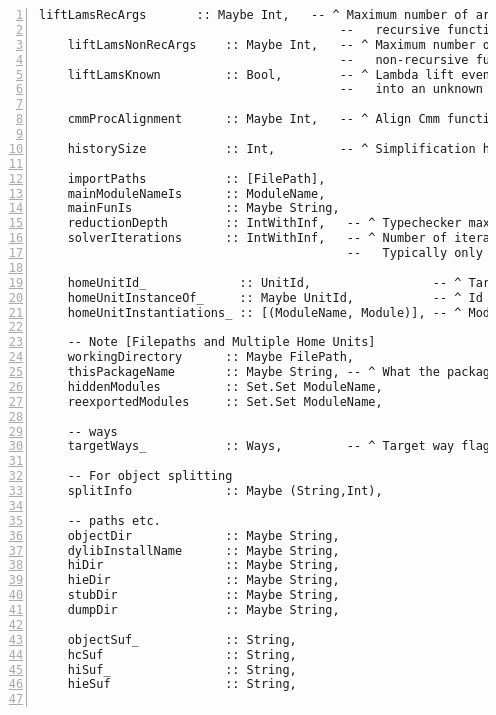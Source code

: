 \documentclass[en]{pracamgr}
\begin{document}
\begin{lstlisting}[numbers=left,stepnumber=1]
    liftLamsRecArgs       :: Maybe Int,   -- ^ Maximum number of arguments after lambda lifting a
                                          --   recursive function.
    liftLamsNonRecArgs    :: Maybe Int,   -- ^ Maximum number of arguments after lambda lifting a
                                          --   non-recursive function.
    liftLamsKnown         :: Bool,        -- ^ Lambda lift even when this turns a known call
                                          --   into an unknown call.
  
    cmmProcAlignment      :: Maybe Int,   -- ^ Align Cmm functions at this boundary or use default.
  
    historySize           :: Int,         -- ^ Simplification history size
  
    importPaths           :: [FilePath],
    mainModuleNameIs      :: ModuleName,
    mainFunIs             :: Maybe String,
    reductionDepth        :: IntWithInf,   -- ^ Typechecker maximum stack depth
    solverIterations      :: IntWithInf,   -- ^ Number of iterations in the constraints solver
                                           --   Typically only 1 is needed
  
    homeUnitId_             :: UnitId,                 -- ^ Target home unit-id
    homeUnitInstanceOf_     :: Maybe UnitId,           -- ^ Id of the unit to instantiate
    homeUnitInstantiations_ :: [(ModuleName, Module)], -- ^ Module instantiations
  
    -- Note [Filepaths and Multiple Home Units]
    workingDirectory      :: Maybe FilePath,
    thisPackageName       :: Maybe String, -- ^ What the package is called, use with multiple home units
    hiddenModules         :: Set.Set ModuleName,
    reexportedModules     :: Set.Set ModuleName,
  
    -- ways
    targetWays_           :: Ways,         -- ^ Target way flags from the command line
  
    -- For object splitting
    splitInfo             :: Maybe (String,Int),
  
    -- paths etc.
    objectDir             :: Maybe String,
    dylibInstallName      :: Maybe String,
    hiDir                 :: Maybe String,
    hieDir                :: Maybe String,
    stubDir               :: Maybe String,
    dumpDir               :: Maybe String,
  
    objectSuf_            :: String,
    hcSuf                 :: String,
    hiSuf_                :: String,
    hieSuf                :: String,
  

\end{lstlisting}
\end{document}

